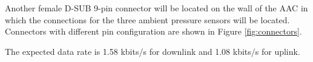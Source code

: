 Another female D-SUB 9-pin connector will be located on the wall of the AAC in which the connections for the three ambient pressure sensors will be located. Connectors with different pin configuration are shown in Figure \ref{fig:connectors}.

The expected data rate is 1.58 kbits/s for downlink and 1.08 kbits/s for uplink.

\raggedbottom